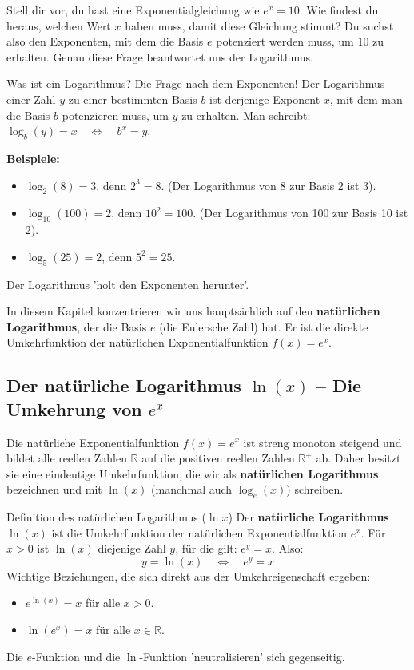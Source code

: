 Stell dir vor, du hast eine Exponentialgleichung wie $e^x = 10$. Wie findest du heraus, welchen Wert $x$ haben muss, damit diese Gleichung stimmt? Du suchst also den Exponenten, mit dem die Basis $e$ potenziert werden muss, um 10 zu erhalten. Genau diese Frage beantwortet uns der Logarithmus.

\begin{infoboxumgebung}{Was ist ein Logarithmus? Die Frage nach dem Exponenten!}
Der Logarithmus einer Zahl $y$ zu einer bestimmten Basis $b$ ist derjenige Exponent $x$, mit dem man die Basis $b$ potenzieren muss, um $y$ zu erhalten.
Man schreibt: $\log_b (y) = x \quad \Leftrightarrow \quad b^x = y$.

\textbf{Beispiele:}
\begin{itemize}
    \item $\log_2 (8) = 3$, denn $2^3 = 8$. (Der Logarithmus von 8 zur Basis 2 ist 3).
    \item $\log_{10} (100) = 2$, denn $10^2 = 100$. (Der Logarithmus von 100 zur Basis 10 ist 2).
    \item $\log_5 (25) = 2$, denn $5^2 = 25$.
\end{itemize}
Der Logarithmus 'holt den Exponenten herunter'.
\end{infoboxumgebung}

In diesem Kapitel konzentrieren wir uns hauptsächlich auf den \textbf{natürlichen Logarithmus}, der die Basis $e$ (die Eulersche Zahl) hat. Er ist die direkte Umkehrfunktion der natürlichen Exponentialfunktion $f(x)=e^x$.

\subsection{Der natürliche Logarithmus \texorpdfstring{$\ln(x)$}{ln(x)} – Die Umkehrung von \texorpdfstring{$e^x$}{e hoch x}}
\label{subsec:natuerlicher_logarithmus}

Die natürliche Exponentialfunktion $f(x)=e^x$ ist streng monoton steigend und bildet alle reellen Zahlen $\mathbb{R}$ auf die positiven reellen Zahlen $\mathbb{R}^+$ ab. Daher besitzt sie eine eindeutige Umkehrfunktion, die wir als \textbf{natürlichen Logarithmus} bezeichnen und mit $\ln(x)$ (manchmal auch $\log_e(x)$) schreiben.

\begin{merksatzumgebung}[def_ln]{Definition des natürlichen Logarithmus (\texorpdfstring{$\ln x$}{ln(x)})}
Der \textbf{natürliche Logarithmus} $\ln(x)$ ist die Umkehrfunktion der natürlichen Exponentialfunktion $e^x$.
Für $x > 0$ ist $\ln(x)$ diejenige Zahl $y$, für die gilt: $e^y = x$.
Also:
\[ y = \ln(x) \quad \Leftrightarrow \quad e^y = x \]
Wichtige Beziehungen, die sich direkt aus der Umkehreigenschaft ergeben:
\begin{itemize}
    \item $e^{\ln(x)} = x$ für alle $x > 0$.
    \item $\ln(e^x) = x$ für alle $x \in \mathbb{R}$.
\end{itemize}
Die $e$-Funktion und die $\ln$-Funktion 'neutralisieren' sich gegenseitig.
\end{merksatzumgebung}


